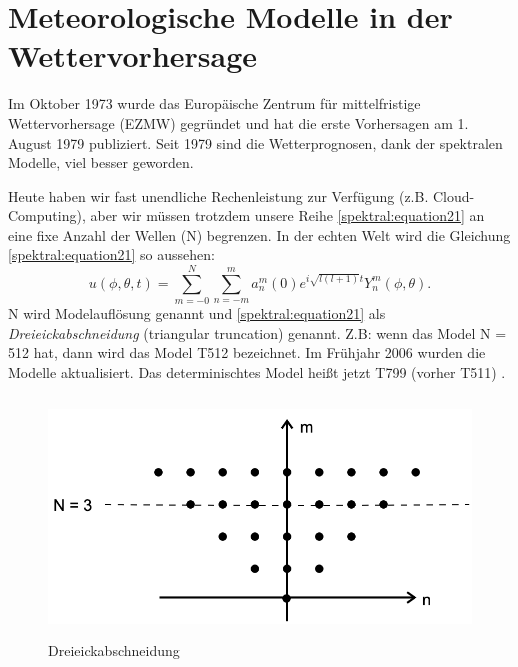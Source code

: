 %
%
%
%
\section{Meteorologische Modelle in der Wettervorhersage
\label{spektral:section:modelle}}

Im Oktober 1973 wurde das Europäische Zentrum für mittelfristige Wettervorhersage (EZMW) gegründet \cite{spektral:ezmw} und hat die erste Vorhersagen am 1. August 1979 publiziert.
Seit 1979 sind die Wetterprognosen, dank der spektralen Modelle, viel besser geworden.

Heute haben wir fast unendliche Rechenleistung zur Verfügung (z.B. Cloud-Computing), aber wir müssen trotzdem unsere Reihe \eqref{spektral:equation21} an eine fixe Anzahl der Wellen (N) begrenzen.
In der echten Welt wird die Gleichung \eqref{spektral:equation21} so aussehen:
\begin{equation}
u(\phi, \theta, t) = \sum_{m=-0}^{N}\sum_{n=-m}^{m}a_n^m(0)e^{i\sqrt{l(l+1)}t}Y_n^m(\phi, \theta).
\label{spektral:equation22}
\end{equation}
N wird Modelauflösung genannt \cite[Seite 223]{spektral:NumericalWeatherPrediction} und \eqref{spektral:equation21} als \textit{Dreieickabschneidung} (triangular truncation) genannt.
Z.B: wenn das Model N = 512 hat, dann wird das Model T512 bezeichnet. 
Im Frühjahr 2006 wurden die Modelle aktualisiert. Das determinischtes Model heißt jetzt T799 (vorher T511) \cite[Seite 222]{spektral:NumericalWeatherPrediction}.

\begin{figure}[h]
	\centering
	\includegraphics[height=180pt]{papers/spektral/images/triangle_truncation.png}
	\caption{Dreieickabschneidung}
    \label{spektral:fig:triangletrunc}
\end{figure}

